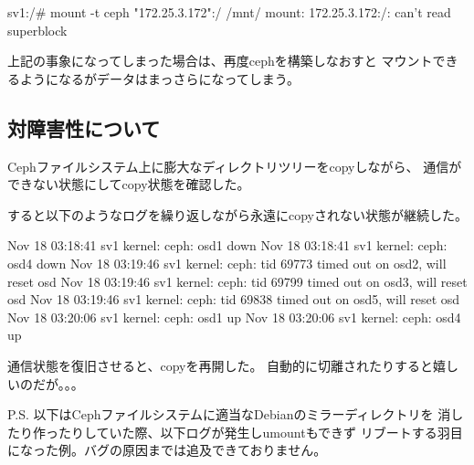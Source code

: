 \documentclass[mingoth,a4paper]{jsarticle}
\begin{document}
\begin{commandline}
sv1:/# mount -t ceph "172.25.3.172":/ /mnt/
mount: 172.25.3.172:/: can't read superblock
\end{commandline}

上記の事象になってしまった場合は、再度cephを構築しなおすと
マウントできるようになるがデータはまっさらになってしまう。

\subsection{対障害性について}
Cephファイルシステム上に膨大なディレクトリツリーをcopyしながら、
通信ができない状態にしてcopy状態を確認した。

すると以下のようなログを繰り返しながら永遠にcopyされない状態が継続した。
\begin{commandline}
Nov 18 03:18:41 sv1 kernel: ceph: osd1 down
Nov 18 03:18:41 sv1 kernel: ceph: osd4 down
Nov 18 03:19:46 sv1 kernel: ceph:  tid 69773 timed out on osd2, will reset osd
Nov 18 03:19:46 sv1 kernel: ceph:  tid 69799 timed out on osd3, will reset osd
Nov 18 03:19:46 sv1 kernel: ceph:  tid 69838 timed out on osd5, will reset osd
Nov 18 03:20:06 sv1 kernel: ceph: osd1 up
Nov 18 03:20:06 sv1 kernel: ceph: osd4 up
\end{commandline}

通信状態を復旧させると、copyを再開した。
自動的に切離されたりすると嬉しいのだが。。。

P.S.
以下はCephファイルシステムに適当なDebianのミラーディレクトリを
消したり作ったりしていた際、以下ログが発生しumountもできず
リブートする羽目になった例。バグの原因までは追及できておりません。
\end{document}
